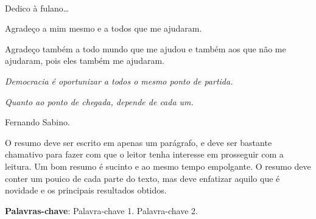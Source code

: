 \documentclass[
	12pt,				%
	openright,			%
	oneside,			%
	a4paper,			%
	brazil				%
	]{abntex2}
\renewcommand{\imprimircapa}{%
  \begin{capa}%
    \center
    \ABNTEXchapterfont\Large \imprimirinstituicao \\
    \vspace*{1cm}
    {\ABNTEXchapterfont\large\imprimirautor}
    \vfill
    \ABNTEXchapterfont\bfseries\LARGE\imprimirtitulo
    \vfill
    \large\imprimirlocal
    \par
    \large\imprimirdata
    \vspace*{1cm}
  \end{capa}
}
\begin{document}
\frenchspacing     %


\imprimircapa

\imprimirfolhaderosto

\begin{dedicatoria}  %
  \vspace*{\fill}
  Dedico à fulano\ldots{}
  \vspace*{\fill}
\end{dedicatoria}


\begin{agradecimentos}
  \bigskip
  Agradeço a mim mesmo e a todos que me ajudaram.

Agradeço também a todo mundo que me ajudou e também aos que não me
ajudaram, pois eles também me ajudaram.
\end{agradecimentos}

\begin{epigrafe} %
  \vspace*{\fill}
  \begin{flushright}
    \emph{Democracia é oportunizar a todos o mesmo ponto de partida.}

\emph{Quanto ao ponto de chegada, depende de cada um.}

Fernando Sabino.
  \end{flushright}
\end{epigrafe}

\newpage
\setlength{\absparsep}{18pt}   %
\setlength{\abstitleskip}{1cm} %

\begin{resumo}
  \SingleSpacing
  O resumo deve ser escrito em apenas um parágrafo, e deve ser bastante
  chamativo para fazer com que o leitor tenha interesse em prosseguir com
  a leitura. Um bom resumo é sucinto e ao mesmo tempo empolgante. O resumo
  deve conter um pouico de cada parte do texto, mas deve enfatizar aquilo
  que é novidade e os principais resultados obtidos.

  \textbf{Palavras-chave}:
    Palavra-chave 1.
    Palavra-chave 2.
  \end{resumo}
\end{document}
